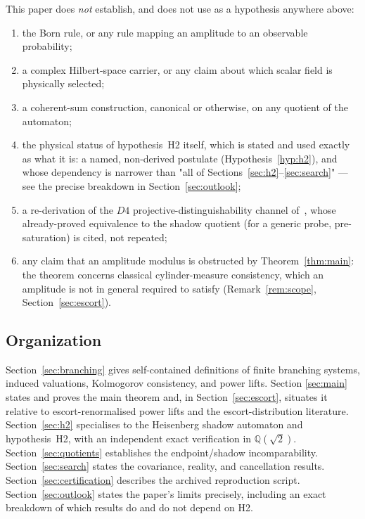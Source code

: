 \documentclass[11pt,a4paper]{article}
\theoremstyle{definition}
\theoremstyle{remark}
\newcommand{\Q}{\mathbb{Q}}
\newcommand{\Qroot}{\Q(\sqrt{2})}
\begin{document}
This paper does \emph{not} establish, and does not use as a hypothesis anywhere above:
\begin{enumerate}[label=(\roman*)]
  \item the Born rule, or any rule mapping an amplitude to an observable probability;
  \item a complex Hilbert-space carrier, or any claim about which scalar field is
  physically selected;
  \item a coherent-sum construction, canonical or otherwise, on any quotient of the
  automaton;
  \item the physical status of hypothesis~\textup{H2} itself, which is stated and used
  exactly as what it is: a named, non-derived postulate (Hypothesis~\ref{hyp:h2}), and
  whose dependency is narrower than "all of Sections~\ref{sec:h2}--\ref{sec:search}" ---
  see the precise breakdown in Section~\ref{sec:outlook};
  \item a re-derivation of the $D4$ projective-distinguishability channel
  of~\cite{Beau2026tb}, whose already-proved equivalence to the shadow quotient
  (for a generic probe, pre-saturation) is cited, not repeated;
  \item any claim that an amplitude modulus is obstructed by Theorem~\ref{thm:main}:
  the theorem concerns classical cylinder-measure consistency, which an amplitude is not
  in general required to satisfy (Remark~\ref{rem:scope}, Section~\ref{sec:escort}).
\end{enumerate}

\subsection{Organization}

Section~\ref{sec:branching} gives self-contained definitions of finite branching
systems, induced valuations, Kolmogorov consistency, and power lifts. Section
\ref{sec:main} states and proves the main theorem and, in
Section~\ref{sec:escort}, situates it relative to escort-renormalised power lifts and
the escort-distribution literature. Section~\ref{sec:h2} specialises to the Heisenberg
shadow automaton and hypothesis~\textup{H2}, with an independent exact verification in
$\Qroot$. Section~\ref{sec:quotients} establishes the endpoint/shadow incomparability.
Section~\ref{sec:search} states the covariance, reality, and cancellation results.
Section~\ref{sec:certification} describes the archived reproduction script.
Section~\ref{sec:outlook} states the paper's limits precisely, including an exact
breakdown of which results do and do not depend on \textup{H2}.
\end{document}
